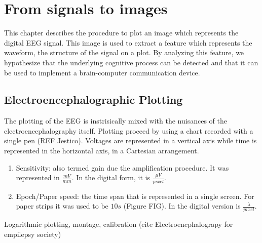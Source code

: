\chapter{From signals to images}
\label{chapter:two}


This chapter describes the procedure to plot an image which represents the digital EEG signal.  This image is used to extract a feature which represents the waveform, the structure of the signal on a plot.  By analyzing this feature, we hypothesize that the underlying cognitive process can be detected and that it can be used to implement a brain-computer communication device.

\section{Electroencephalographic Plotting}

The plotting of the EEG is instrisically mixed with the nuisances of the electroencephalography itself.  Plotting proceed by using a chart recorded with a single pen (REF Jestico).   Voltages are represented in a vertical axis while time is represented in the horizontal axis, in a Cartesian arrangement. 

\begin{enumerate}
\item Sensitivity: also termed gain due the amplification procedure.  It was represented in $ \frac{mV}{mm}$.  In the digital form, it is $\frac{\mu V}{pixel}$.
\item Epoch/Paper speed: the time span that is represented in a single screen.  For paper strips it was used to be $10s$ (Figure FIG).  In the digital version is $ \frac{\lambda}{pixel}$.
\end{enumerate}

Logarithmic plotting, montage, calibration (cite Electroencphalograpy for empilepsy society)


